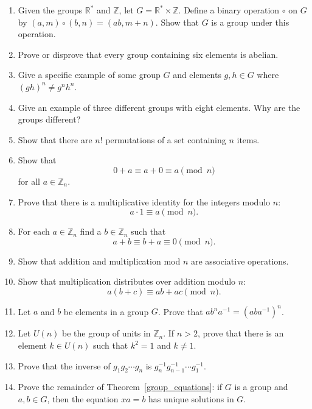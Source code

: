 {\begin{enumerate}
 
\item
Given the groups  ${\mathbb R}^{\ast}$ and ${\mathbb Z}$, let $G = {\mathbb
R}^{\ast}  \times {\mathbb Z}$. Define a binary operation $\circ$ on $G$
by $(a,m) \circ (b,n) = (ab, m+n)$. Show that $G$ is a group under
this operation. 
 
 
\item
Prove or disprove that every group containing six elements is abelian.
 
 
\item
Give a specific example of some group $G$ and elements $g, h \in G$
where $(gh)^n \neq g^nh^n$. 
 
 
\item %
Give an example of three different groups with eight elements.  Why
are the groups different? 
 
 
\item
Show that there are $n!$ permutations of a set containing $n$ items. 
 
 
\item
Show that 
\[
0 + a  \equiv a + 0  \equiv a \pmod{ n }
\]
for all $a \in {\mathbb Z}_n$.
 
 
\item
Prove that there is  a multiplicative identity for the integers modulo
$n$: 
\[
a \cdot  1   \equiv  a \pmod{ n}.
\]
 
 
\item
For each $a \in {\mathbb Z}_n$ find a $b \in {\mathbb Z}_n$ such that
\[
a+b \equiv b+a  \equiv 0 \pmod{ n}.
\]
 
 
\item
Show that addition and multiplication mod $n$ are associative
operations. 
 
 
\item
Show that multiplication distributes over addition modulo $n$:
\[
a  (b  + c)  \equiv a  b + a  c  \pmod{ n}.
\]
 
 
\item
Let $a$ and $b$ be elements in a group $G$.  Prove that $ab^na^{-1} =
(aba^{-1})^n$. 
 
 
\item
Let $U(n)$ be the group of units in ${\mathbb Z}_n$. If $n>2$, prove that
there is an element $k \in U(n)$ such that $k^2 = 1$ and $k \neq 1$.
 
 
\item
Prove that the inverse of $g _1 g_2 \cdots g_n$ is $g_n^{-1}
g_{n-1}^{-1} \cdots g_1^{-1}$. 
 
 
\item
Prove the remainder of Theorem~\ref{group_equations}: if $G$ is a group and $a, b \in G$, then
the equation $xa = b$ has unique solutions in $G$. 
 

\end{enumerate}}
